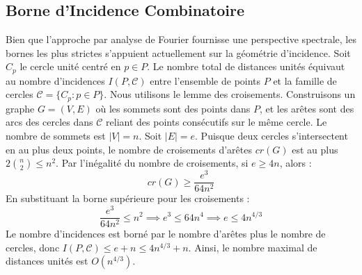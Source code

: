 \documentclass[11pt,a4paper]{article}
\begin{document}
\subsection{Borne d'Incidence Combinatoire}
Bien que l'approche par analyse de Fourier fournisse une perspective spectrale, les bornes les plus strictes s'appuient actuellement sur la géométrie d'incidence. Soit $C_p$ le cercle unité centré en $p \in P$. Le nombre total de distances unités équivaut au nombre d'incidences $I(P, \mathcal{C})$ entre l'ensemble de points $P$ et la famille de cercles $\mathcal{C} = \{C_p : p \in P\}$. Nous utilisons le lemme des croisements. Construisons un graphe $G = (V, E)$ où les sommets sont des points dans $P$, et les arêtes sont des arcs des cercles dans $\mathcal{C}$ reliant des points consécutifs sur le même cercle. Le nombre de sommets est $|V| = n$. Soit $|E| = e$. Puisque deux cercles s'intersectent en au plus deux points, le nombre de croisements d'arêtes $cr(G)$ est au plus $2 \binom{n}{2} \leq n^2$. Par l'inégalité du nombre de croisements, si $e \geq 4n$, alors :
$$ cr(G) \geq \frac{e^3}{64 n^2} $$
En substituant la borne supérieure pour les croisements :
$$ \frac{e^3}{64 n^2} \leq n^2 \implies e^3 \leq 64 n^4 \implies e \leq 4 n^{4/3} $$
Le nombre d'incidences est borné par le nombre d'arêtes plus le nombre de cercles, donc $I(P, \mathcal{C}) \leq e + n \leq 4n^{4/3} + n$. Ainsi, le nombre maximal de distances unités est $O(n^{4/3})$.
\end{document}
